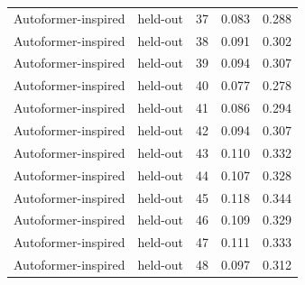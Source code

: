 \begin{tabular}{llrrr}
Autoformer-inspired & held-out & 37 & 0.083 & 0.288 \\
Autoformer-inspired & held-out & 38 & 0.091 & 0.302 \\
Autoformer-inspired & held-out & 39 & 0.094 & 0.307 \\
Autoformer-inspired & held-out & 40 & 0.077 & 0.278 \\
Autoformer-inspired & held-out & 41 & 0.086 & 0.294 \\
Autoformer-inspired & held-out & 42 & 0.094 & 0.307 \\
Autoformer-inspired & held-out & 43 & 0.110 & 0.332 \\
Autoformer-inspired & held-out & 44 & 0.107 & 0.328 \\
Autoformer-inspired & held-out & 45 & 0.118 & 0.344 \\
Autoformer-inspired & held-out & 46 & 0.109 & 0.329 \\
Autoformer-inspired & held-out & 47 & 0.111 & 0.333 \\
Autoformer-inspired & held-out & 48 & 0.097 & 0.312 \\
\bottomrule
\end{tabular}
